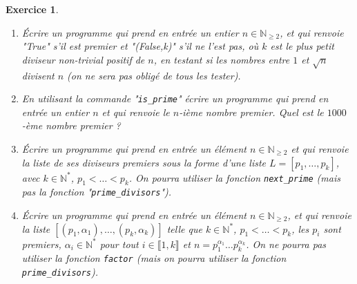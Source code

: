 \documentclass[11pt,a4paper]{article}
\newtheorem{ex}{Exercice}
\newcommand{\N}{\mathbb{N}}
\begin{document}
\begin{ex}
\begin{enumerate}
\item Écrire un programme qui prend en entrée un entier $n\in \N_{\geq 2}$, et qui renvoie "True" s'il est premier et "(False,k)" s'il ne l'est pas, où $k$ est le plus petit diviseur non-trivial positif de $n$, en testant si les nombres  entre $1$ et $ \sqrt{n}$ divisent $n$ (on ne sera pas obligé de tous les tester).

\item En utilisant la commande "\texttt{is\_prime}"  écrire un programme qui prend en entrée un entier $n$ et qui renvoie le $n$-ième nombre premier. Quel est le $1000$-ème nombre premier ?

\item Écrire un programme qui prend en entrée un élément $n\in \N_{\geq 2}$ et qui renvoie la liste de ses diviseurs premiers sous la forme d'une liste $L=[p_1,\ldots,p_k]$, avec $k\in \N^*$, $p_1< \ldots <p_k$. On pourra utiliser la fonction \texttt{next\_prime} (mais pas la fonction "\texttt{prime\_divisors}").


 \item Écrire un programme qui prend en entrée un élément $n\in \N_{\geq 2}$, et qui renvoie la liste $[(p_1,\alpha_1),\ldots,(p_k,\alpha_k)]$ telle que $k\in \N^*$, $p_1<\ldots<p_k$, les $p_i$ sont premiers, $\alpha_i\in \N^*$ pour tout $i\in \llbracket 1,k\rrbracket$ et $n=p_1^{\alpha_1}\ldots p_k^{\alpha_k}$. On ne  pourra pas utiliser la fonction \texttt{factor} (mais on pourra utiliser la fonction \texttt{prime\_divisors}). 
\end{enumerate}
\end{ex}
\end{document}
